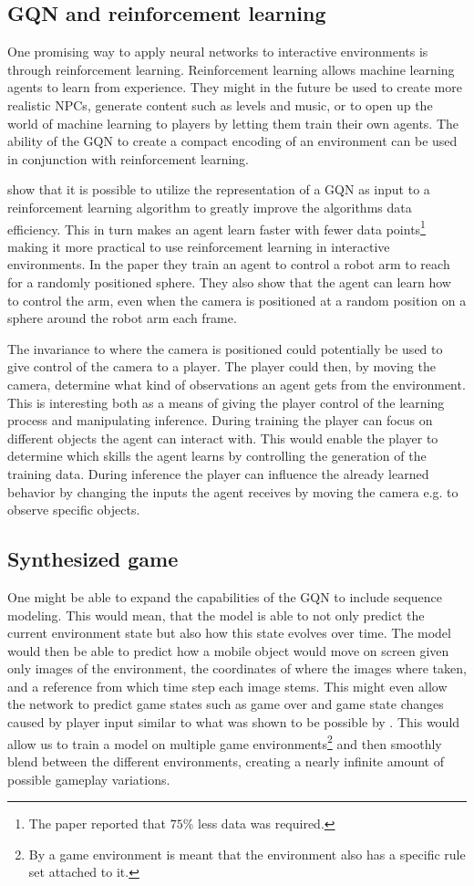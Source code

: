 \subsection{GQN and reinforcement learning}
One promising way to apply neural networks to interactive environments is through reinforcement learning. Reinforcement learning allows machine learning agents to learn from experience. They might in the future be used to create more realistic NPCs, generate content such as levels and music, or to open up the world of machine learning to players by letting them train their own agents. The ability of the GQN to create a compact encoding of an environment can be used in conjunction with reinforcement learning.

\cite{gqn} show that it is possible to utilize the representation of a GQN as input to a reinforcement learning algorithm to greatly improve the algorithms data efficiency. This in turn makes an agent learn faster with fewer data points\footnote{The paper reported that $75\%$ less data was required.} making it more practical to use reinforcement learning in interactive environments. In the paper they train an agent to control a robot arm to reach for a randomly positioned sphere. They also show that the agent can learn how to control the arm, even when the camera is positioned at a random position on a sphere around the robot arm each frame.

The invariance to where the camera is positioned could potentially be used to give control of the camera to a player. The player could then, by moving the camera, determine what kind of observations an agent gets from the environment. This is interesting both as a means of giving the player control of the learning process and manipulating inference. During training the player can focus on different objects the agent can interact with. This would enable the player to determine which skills the agent learns by controlling the generation of the training data. During inference the player can influence the already learned behavior by changing the inputs the agent receives by moving the camera e.g. to observe specific objects.

\subsection{Synthesized game}
One might be able to expand the capabilities of the GQN to include sequence modeling. This would mean, that the model is able to not only predict the current environment state but also how this state evolves over time. The model would then be able to predict how a mobile object would move on screen given only images of the environment, the coordinates of where the images where taken, and a reference from which time step each image stems. This might even allow the network to predict game states such as game over and game state changes caused by player input similar to what was shown to be possible by \cite{Ha2018-dd}. This would allow us to train a model on multiple game environments\footnote{By a game environment is meant that the environment also has a specific rule set attached to it.} and then smoothly blend between the different environments, creating a nearly infinite amount of possible gameplay variations.

